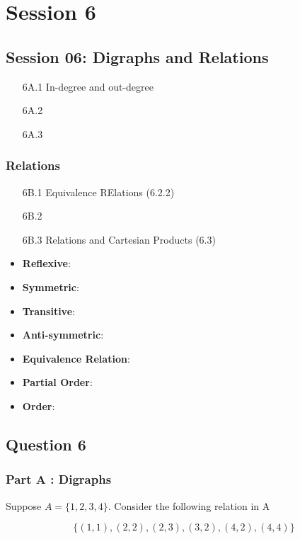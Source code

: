 \documentclass[]{report}
\begin{document}
	
\chapter{Session 6}
\section*{Session 06: Digraphs and Relations}
\begin{itemize}
\item[6A.1] In-degree and out-degree
\item[6A.2]
\item[6A.3]
\end{itemize}
\subsection*{Relations}
\begin{itemize}
\item[6B.1] Equivalence RElations (6.2.2)
\item[6B.2]
\item[6B.3] Relations and Cartesian Products (6.3)
\end{itemize}


\begin{itemize}
\item \textbf{Reflexive}: 
\item \textbf{Symmetric}: 
\item \textbf{Transitive}: 
\item \textbf{Anti-symmetric}: 
\item \textbf{Equivalence Relation}: 
\item \textbf{Partial Order}:
\item \textbf{Order}:
\end{itemize}

\section*{Question 6}

\subsection*{Part A : Digraphs}

Suppose $A = \{1,2,3,4\}$. Consider the following relation in A

\[ \{  (1,1),(2,2),(2,3),(3,2),(4,2),(4,4)\} \]
\end{document}
